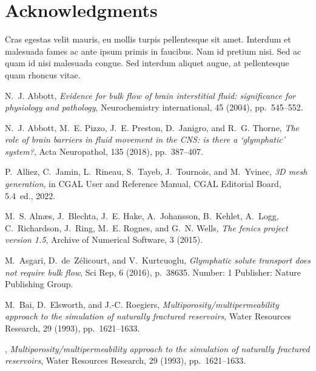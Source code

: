 \documentclass[10pt,letterpaper]{article}
\newcommand{\1}{^{(1)}}
\newcommand{\2}{^{(2)}}
\begin{document}
\section*{Acknowledgments}
Cras egestas velit mauris, eu mollis turpis pellentesque sit amet. Interdum et malesuada fames ac ante ipsum primis in faucibus. Nam id pretium nisi. Sed ac quam id nisi malesuada congue. Sed interdum aliquet augue, at pellentesque quam rhoncus vitae.

\nolinenumbers

\begin{thebibliography}{10}

{\sc N.~J. Abbott}, {\em Evidence for bulk flow of brain interstitial fluid:
  significance for physiology and pathology}, Neurochemistry international, 45
  (2004), pp.~545--552.

{\sc N.~J. Abbott, M.~E. Pizzo, J.~E. Preston, D.~Janigro, and R.~G. Thorne},
  {\em The role of brain barriers in fluid movement in the {CNS}: is there a
  ‘glymphatic’ system?}, Acta Neuropathol, 135 (2018), pp.~387--407.

{\sc P.~Alliez, C.~Jamin, L.~Rineau, S.~Tayeb, J.~Tournois, and M.~Yvinec},
  {\em {3D} mesh generation}, in {CGAL} User and Reference Manual, {CGAL
  Editorial Board}, {5.4}~ed., 2022.

{\sc M.~S. {Aln{\ae}s}, J.~Blechta, J.~E. {Hake}, A.~Johansson, B.~Kehlet,
  A.~Logg, C.~Richardson, J.~Ring, M.~E. {Rognes}, and G.~N. {Wells}}, {\em The
  fenics project version 1.5}, Archive of Numerical Software, 3 (2015).

{\sc M.~Asgari, D.~de~Zélicourt, and V.~Kurtcuoglu}, {\em Glymphatic solute
  transport does not require bulk flow}, Sci Rep, 6 (2016), p.~38635.
\newblock Number: 1 Publisher: Nature Publishing Group.

{\sc M.~Bai, D.~Elsworth, and J.-C. Roegiers}, {\em
  Multiporosity/multipermeability approach to the simulation of naturally
  fractured reservoirs}, Water Resources Research, 29 (1993), pp.~1621--1633.

\leavevmode\vrule height 2pt depth -1.6pt width 23pt, {\em
  Multiporosity/multipermeability approach to the simulation of naturally
  fractured reservoirs}, Water Resources Research, 29 (1993), pp.~1621--1633.


\end{thebibliography}
\end{document}
